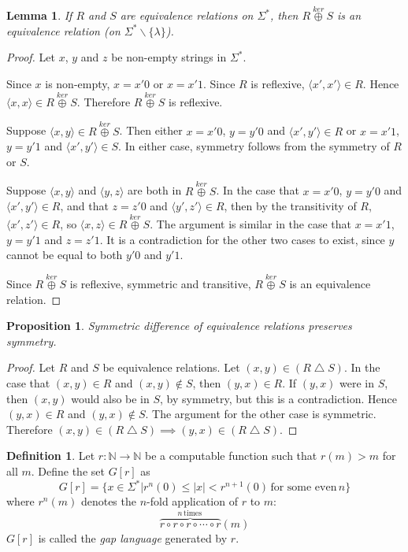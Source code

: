 \documentclass[draft]{article}
\newtheorem{lemma}[lemma]{Lemma}
\newtheorem{proposition}[proposition]{Proposition}
\theoremstyle{definition} \newtheorem{openproblem}[openproblem]{Open problem}
\theoremstyle{definition} \newtheorem{definition}[definition]{Definition}
\theoremstyle{remark} \newtheorem{remark}[remark]{Remark}
\newcommand{\plain}[1]{\,\text{#1}\,} %
\newcommand{\kj}{\overset{ker}{\oplus}} %
\newcommand{\symdiff}{\bigtriangleup} %
\newcommand{\defn}[1]{\emph{#1}} %
\newcommand{\pair}[2]{\langle#1,#2\rangle} %
\begin{document}
\begin{lemma}\label{lem:join}
  If $R$ and $S$ are equivalence relations on $\Sigma^*$, then $R\kj S$ is an equivalence relation (on $\Sigma^*\backslash\{\lambda\}$).
\end{lemma}
\begin{proof}
  Let $x$, $y$ and $z$ be non-empty strings in $\Sigma^*$.
  
  Since $x$ is non-empty, $x=x'0$ or $x=x'1$.
  Since $R$ is reflexive, $\pair{x'}{x'}\in R$.
  Hence $\pair{x}{x}\in R\kj S$.
  Therefore $R\kj S$ is reflexive.
  
  Suppose $\pair{x}{y}\in R\kj S$.
  Then either $x=x'0$, $y=y'0$ and $\pair{x'}{y'}\in R$ or $x=x'1$, $y=y'1$ and $\pair{x'}{y'}\in S$.
  In either case, symmetry follows from the symmetry of $R$ or $S$.

  Suppose $\pair{x}{y}$ and $\pair{y}{z}$ are both in $R\kj S$.
  In the case that $x=x'0$, $y=y'0$ and $\pair{x'}{y'}\in R$, and that $z=z'0$ and $\pair{y'}{z'}\in R$, then by the transitivity of $R$, $\pair{x'}{z'}\in R$, so $\pair{x}{z}\in R\kj S$.
  The argument is similar in the case that $x=x'1$, $y=y'1$ and $z=z'1$.
  It is a contradiction for the other two cases to exist, since $y$ cannot be equal to both $y'0$ and $y'1$.

  Since $R\kj S$ is reflexive, symmetric and transitive, $R\kj S$ is an equivalence relation.
\end{proof}

\begin{proposition}\label{prop:symdiff}
  Symmetric difference of equivalence relations preserves symmetry.
\end{proposition}
\begin{proof}
  Let $R$ and $S$ be equivalence relations.
  Let $(x,y)\in(R\symdiff S)$.
  In the case that $(x,y)\in R$ and $(x,y)\notin S$, then $(y,x)\in R$.
  If $(y,x)$ were in $S$, then $(x,y)$ would also be in $S$, by symmetry, but this is a contradiction.
  Hence $(y,x)\in R$ and $(y,x)\notin S$.
  The argument for the other case is symmetric.
  Therefore $(x,y)\in(R\symdiff S)\implies (y,x)\in(R\symdiff S)$.
\end{proof}

\begin{definition}
  Let $r\colon\mathbb{N}\to\mathbb{N}$ be a computable function such that $r(m)>m$ for all $m$.
  Define the set $G[r]$ as
  \begin{displaymath}
    G[r]=\{x\in\Sigma^*|r^n(0)\leq|x|<r^{n+1}(0) \plain{for some even} n\}
  \end{displaymath}
  where $r^n(m)$ denotes the $n$-fold application of $r$ to $m$:
  \begin{displaymath}
    \overbrace{r\circ r\circ r\circ\cdots\circ r}^{n \plain{times}}(m)
  \end{displaymath}
  $G[r]$ is called the \defn{gap language} generated by $r$.
\end{definition}
\end{document}
